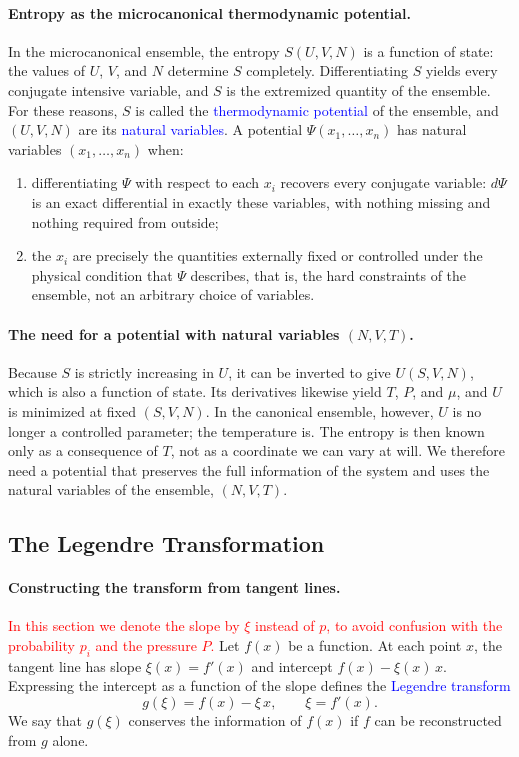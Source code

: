 \paragraph{Entropy as the microcanonical thermodynamic potential.}
In the microcanonical ensemble, the entropy $S(U,V,N)$ is a function of
state: the values of $U$, $V$, and $N$ determine $S$ completely.
Differentiating $S$ yields every conjugate intensive variable, and $S$ is the
extremized quantity of the ensemble. For these reasons, $S$ is called the
\textcolor{blue}{thermodynamic potential} of the ensemble, and $(U,V,N)$ are
its \textcolor{blue}{natural variables}. A potential $\Psi(x_1,\ldots,x_n)$
has natural variables $(x_1,\ldots,x_n)$ when:
\begin{enumerate}
    \item[(i)] differentiating $\Psi$ with respect to each $x_i$ recovers
    every conjugate variable: $d\Psi$ is an exact differential in exactly
    these variables, with nothing missing and nothing required from outside;
    \item[(ii)] the $x_i$ are precisely the quantities externally fixed or
    controlled under the physical condition that $\Psi$ describes, that is,
    the hard constraints of the ensemble, not an arbitrary choice of
    variables.
\end{enumerate}

\paragraph{The need for a potential with natural variables $(N,V,T)$.}
Because $S$ is strictly increasing in $U$, it can be inverted to give
$U(S,V,N)$, which is also a function of state. Its derivatives likewise
yield $T$, $P$, and $\mu$, and $U$ is minimized at fixed $(S,V,N)$. In the
canonical ensemble, however, $U$ is no longer a controlled parameter; the
temperature is. The entropy is then known only as a consequence of $T$, not
as a coordinate we can vary at will. We therefore need a potential that
preserves the full information of the system and uses the natural variables
of the ensemble, $(N,V,T)$.

\subsection{The Legendre Transformation}

\paragraph{Constructing the transform from tangent lines.}
\textcolor{red}{In this section we denote the slope by $\xi$ instead of $p$,
to avoid confusion with the probability $p_i$ and the pressure $P$.}
Let $f(x)$ be a function. At each point $x$, the tangent line has slope
$\xi(x)=f'(x)$ and intercept $f(x)-\xi(x)\,x$. Expressing the intercept as a
function of the slope defines the \textcolor{blue}{Legendre transform}
\begin{equation}
    \boxed{g(\xi)=f(x)-\xi\,x,\qquad \xi=f'(x).}
\end{equation}
We say that $g(\xi)$ conserves the information of $f(x)$ if $f$ can be
reconstructed from $g$ alone.

